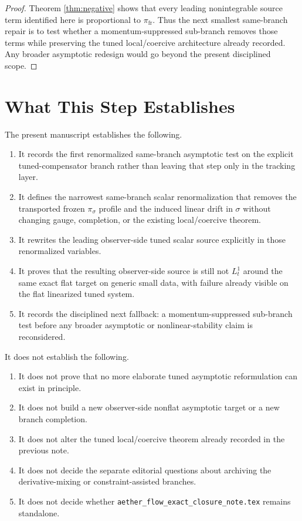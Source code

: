 \documentclass[11pt]{article}
\begin{document}
\begin{proof}
Theorem \ref{thm:negative} shows that every leading nonintegrable source term identified here is proportional to \(\pi_{\mathrm{fr}}\). Thus the next smallest same-branch repair is to test whether a momentum-suppressed sub-branch removes those terms while preserving the tuned local/coercive architecture already recorded. Any broader asymptotic redesign would go beyond the present disciplined scope.
\end{proof}

\section{What This Step Establishes}

The present manuscript establishes the following.
\begin{enumerate}
    \item It records the first renormalized same-branch asymptotic test on the explicit tuned-compensator branch rather than leaving that step only in the tracking layer.
    \item It defines the narrowest same-branch scalar renormalization that removes the transported frozen \(\pi_\sigma\) profile and the induced linear drift in \(\sigma\) without changing gauge, completion, or the existing local/coercive theorem.
    \item It rewrites the leading observer-side tuned scalar source explicitly in those renormalized variables.
    \item It proves that the resulting observer-side source is still not \(L_t^1\) around the same exact flat target on generic small data, with failure already visible on the flat linearized tuned system.
    \item It records the disciplined next fallback: a momentum-suppressed sub-branch test before any broader asymptotic or nonlinear-stability claim is reconsidered.
\end{enumerate}

It does not establish the following.
\begin{enumerate}
    \item It does not prove that no more elaborate tuned asymptotic reformulation can exist in principle.
    \item It does not build a new observer-side nonflat asymptotic target or a new branch completion.
    \item It does not alter the tuned local/coercive theorem already recorded in the previous note.
    \item It does not decide the separate editorial questions about archiving the derivative-mixing or constraint-assisted branches.
    \item It does not decide whether \texttt{aether\_flow\_exact\_closure\_note.tex} remains standalone.
\end{enumerate}
\end{document}
